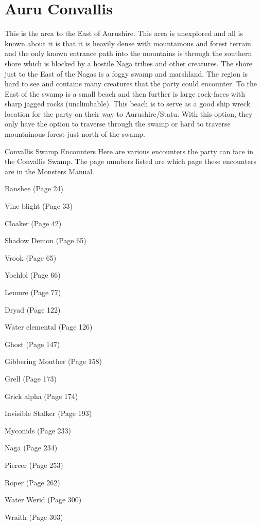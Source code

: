 \section{Auru Convallis}

This is the area to the East of Aurushire. This area is unexplored and all is known about it is that it is heavily dense with mountainous and forest terrain and the only known entrance path into the mountains is through the southern shore which is blocked by a hostile Naga tribes and other creatures. The shore just to the East of the Nagas is a foggy swamp and marshland. The region is hard to see and contains many creatures that the party could encounter. To the East of the swamp is a small beach and then further is large rock-faces with sharp jagged rocks (unclimbable). This beach is to serve as a good ship wreck location for the party on their way to Aurushire/Statu. With this option, they only have the option to traverse through the swamp or hard to traverse mountainous forest just north of the swamp.

\begin{commentbox}{Convallis Swamp Encounters}
	Here are various encounters the party can face in the Convallis Swamp. The page numbers listed are which page these encounters are in the Monsters Manual. 
	
	\hline
	\begin{description}
		\begin{multicols}{2}
			\item[1:] Banshee (Page 24)
			\item[2:] Vine blight (Page 33)
			\item[3:] Cloaker (Page 42)
			\item[4:] Shadow Demon (Page 65)
			\item[5:] Vrook (Page 65)
			\item[6:] Yochlol (Page 66)
			\item[7:] Lemure (Page 77)
			\item[8:] Dryad (Page 122)
			\item[9:] Water elemental (Page 126)
			\item[10:]  Ghost (Page 147)
			\item[11:] Gibbering Mouther (Page 158)
			\item[12:] Grell (Page 173)
			\item[13:] Grick alpha (Page 174)
			\item[14:] Invisible Stalker (Page 193)
			\item[15:] Myconids (Page 233)
			\item[16:] Naga (Page 234)
			\item[17:] Piercer (Page 253)
			\item[18:] Roper (Page 262)
			\item[19:] Water Werid (Page 300)
			\item[20:] Wraith (Page 303)
		\end{multicols}
	\end{description}
\end{commentbox}